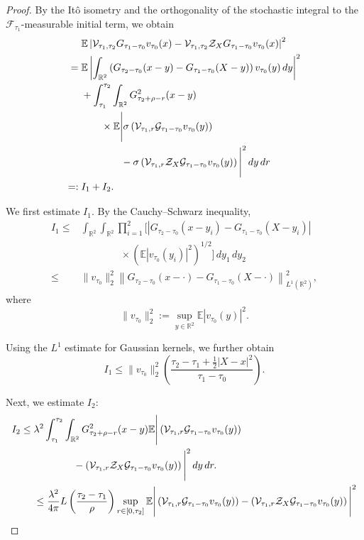 \begin{proof}
By the It\^o isometry and the orthogonality
of the stochastic integral to the
$\mathcal F_{\tau_1}$-measurable initial term,
we obtain
\begin{align*}
&\mathbb E\left|
\mathcal V_{\tau_1,\tau_2}
G_{\tau_1-\tau_0}v_{\tau_0}(x)
-
\mathcal V_{\tau_1,\tau_2}
\mathcal Z_X G_{\tau_1-\tau_0}v_{\tau_0}(x)
\right|^2
\\
={}&
\mathbb E\left|
\int_{\mathbb R^2}
\left(
G_{\tau_2-\tau_0}(x-y)
-
G_{\tau_1-\tau_0}(X-y)
\right)
v_{\tau_0}(y)\,dy
\right|^2
\\
&+
\int_{\tau_1}^{\tau_2}
\int_{\mathbb R^2}
G_{\tau_2+\rho-r}^2(x-y)
\\
&\qquad\times
\mathbb E\Bigg|
\sigma\left(
\mathcal V_{\tau_1,r}
\mathcal{G}_{\tau_1-\tau_0}v_{\tau_0}(y)
\right)
\\
&\qquad\qquad-
\sigma\left(
\mathcal V_{\tau_1,r}
\mathcal Z_X \mathcal{G}_{\tau_1-\tau_0}v_{\tau_0}(y)
\right)
\Bigg|^2\,dy\,dr
\\
=:{}& I_1+I_2.
\end{align*}

We first estimate $I_1$. By the
Cauchy--Schwarz inequality,
\begin{align*}
I_1
\leq{}&
\int_{\mathbb R^2}
\int_{\mathbb R^2}
\prod_{i=1}^{2}
\Bigg[
\left|
G_{\tau_2-\tau_0}(x-y_i)
-
G_{\tau_1-\tau_0}(X-y_i)
\right|
\\
&\qquad\qquad\times
\left(
\mathbb E|v_{\tau_0}(y_i)|^2
\right)^{1/2}
\Bigg]
\,dy_1\,dy_2
\\
\leq{}&
\|v_{\tau_0}\|_2^2
\left\|
G_{\tau_2-\tau_0}(x-\cdot)
-
G_{\tau_1-\tau_0}(X-\cdot)
\right\|_{L^1(\mathbb R^2)}^2,
\end{align*}
where
\[
\|v_{\tau_0}\|_2^2
:=
\sup_{y\in\mathbb R^2}
\mathbb E|v_{\tau_0}(y)|^2.
\]

Using the $L^1$ estimate for Gaussian
kernels, we further obtain
\begin{equation*}
I_1
\leq 
\|v_{\tau_0}\|_2^2
\left(\frac{
\tau_2-\tau_1+\frac12|X-x|^2
}{
\tau_1-\tau_0
}\right).
\end{equation*}

Next, we estimate $I_2$:
\begin{align*}
I_2
\leq{}&
\lambda^2
\int_{\tau_1}^{\tau_2}
\int_{\mathbb R^2}
G_{\tau_2+\rho-r}^2(x-y)\mathbb E\Bigg|
\left(
\mathcal V_{\tau_1,r}
\mathcal{G}_{\tau_1-\tau_0}v_{\tau_0}(y)
\right)
\\
&\qquad\qquad-
\left(
\mathcal V_{\tau_1,r}
\mathcal Z_X \mathcal{G}_{\tau_1-\tau_0}v_{\tau_0}(y)
\right)
\Bigg|^2
\,dy\,dr. \\
&\leq
\dfrac{\lambda^2}{4\pi}L\left(\dfrac{\tau_2-\tau_1}{\rho}\right)\sup_{r\in[0,\tau_2]}\mathbb E\Bigg|
\left(
\mathcal V_{\tau_1,r}
\mathcal{G}_{\tau_1-\tau_0}v_{\tau_0}(y)
\right) -
\left(
\mathcal V_{\tau_1,r}
\mathcal Z_X \mathcal{G}_{\tau_1-\tau_0}v_{\tau_0}(y)
\right)
\Bigg|^2
\end{align*}


\end{proof}
